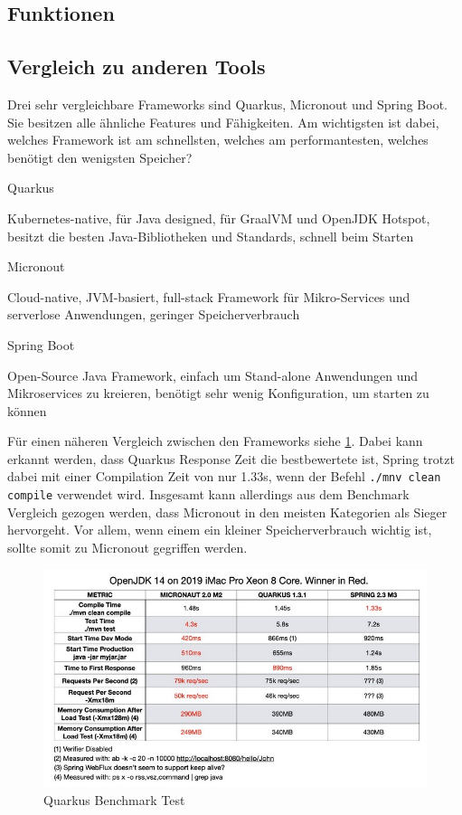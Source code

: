 \subsection{Funktionen}
\subsection{Vergleich zu anderen Tools}
Drei sehr vergleichbare Frameworks sind Quarkus, Micronout und Spring Boot. Sie besitzen alle ähnliche Features und Fähigkeiten.
Am wichtigsten ist dabei, welches Framework ist am schnellsten, welches am performantesten, welches benötigt den wenigsten Speicher?
 
 
\begin{compactitem}
    \item[Quarkus]
    \item Kubernetes-native, für Java designed, für GraalVM und OpenJDK Hotspot, besitzt die besten Java-Bibliotheken und Standards, schnell beim Starten
    \item[Micronout]
    \item Cloud-native, JVM-basiert, full-stack Framework für Mikro-Services und serverlose Anwendungen, geringer Speicherverbrauch
    \item[Spring Boot]
    \item Open-Source Java Framework, einfach um Stand-alone Anwendungen und Mikroservices zu kreieren, benötigt sehr wenig Konfiguration, um starten zu können
\end{compactitem}
 
Für einen näheren Vergleich zwischen den Frameworks siehe \ref{fig:impl:Quarkusbenchmark}. Dabei kann erkannt werden, dass Quarkus Response Zeit die bestbewertete ist, Spring trotzt dabei mit einer Compilation Zeit von nur 1.33s, wenn der Befehl \texttt{./mnv clean compile} verwendet wird. Insgesamt kann allerdings aus dem Benchmark Vergleich gezogen werden, dass Micronout in den meisten Kategorien als Sieger hervorgeht. Vor allem, wenn einem ein kleiner Speicherverbrauch wichtig ist, sollte somit zu Micronout gegriffen werden.
 
\begin{figure}
    \centering
    \includegraphics[scale=0.8]{pics/quarkus_benchmark.jpg}
    \caption{Quarkus Benchmark Test}
    \label{fig:impl:Quarkusbenchmark}
\end{figure}
 
